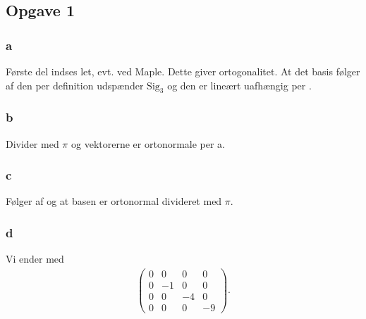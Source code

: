 		\subsection{Opgave 1}

			\subsubsection{a}

				Første del indses let, evt. ved Maple. Dette giver ortogonalitet. At det basis følger af den per definition udspænder $\text{Sig}_3$ og den er lineært uafhængig per \cite[Definition 4.3.4]{hesselholt2017}.

			\subsubsection{b}

				Divider med $\pi$ og vektorerne er ortonormale per a.

			\subsubsection{c}

				Følger af \cite[Sætning 6.2.6]{hesselholt2017} og at basen er ortonormal divideret med $\pi$.


			\subsubsection{d}

				Vi ender med
					\begin{align*}
						\left(\begin{array}{rrrr} 0 & 0 & 0 & 0 \\ 0 & -1 & 0 & 0 \\ 0 & 0 & -4 & 0 \\ 0 & 0 & 0 & -9 \end{array}\right).
					\end{align*} 

				












	



